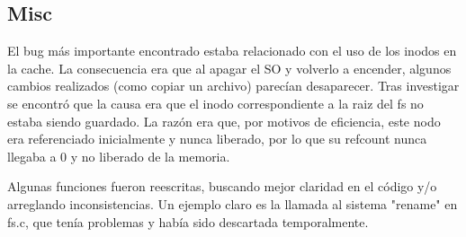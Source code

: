 \subsection{Misc}

El bug más importante encontrado estaba relacionado con el uso de los inodos en
la cache. La consecuencia era que al apagar el SO y volverlo a encender, algunos
cambios realizados (como copiar un archivo) parecían desaparecer. Tras
investigar se encontró que la causa era que el inodo correspondiente a la raiz
del fs no estaba siendo guardado. La razón era que, por motivos de eficiencia,
este nodo era referenciado inicialmente y nunca liberado, por lo que su refcount
nunca llegaba a 0 y no liberado de la memoria.

Algunas funciones fueron reescritas, buscando mejor claridad en el código y/o
arreglando inconsistencias. Un ejemplo claro es la llamada al sistema "rename"
en fs.c, que tenía problemas y había sido descartada temporalmente.
